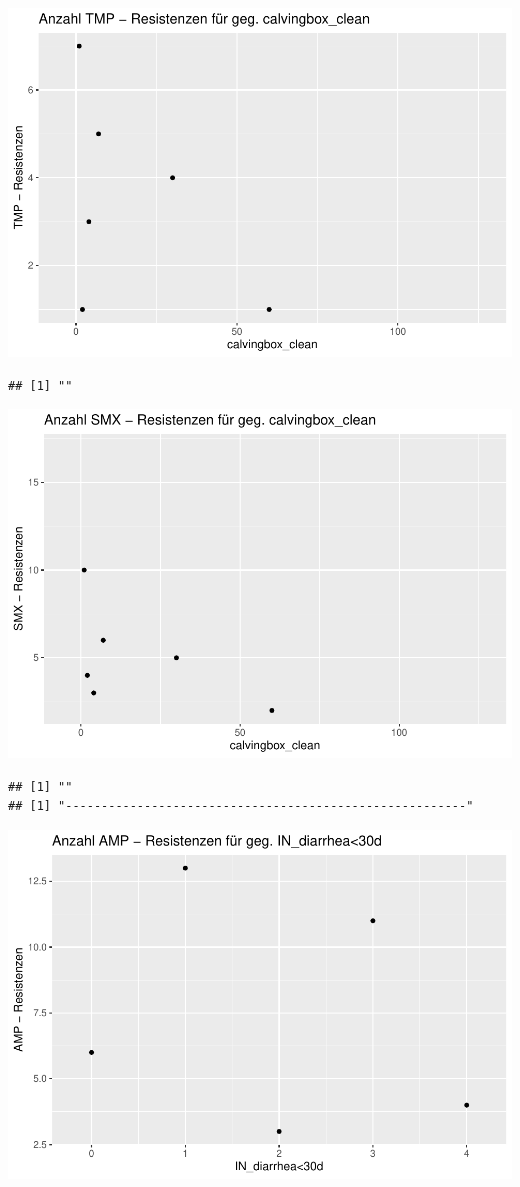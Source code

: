 \documentclass[
]{article}
\begin{document}
\includegraphics{NResistenzen_files/figure-latex/unnamed-chunk-6-29.pdf}

\begin{verbatim}
## [1] ""
\end{verbatim}

\includegraphics{NResistenzen_files/figure-latex/unnamed-chunk-6-30.pdf}

\begin{verbatim}
## [1] ""
## [1] "--------------------------------------------------------"
\end{verbatim}

\includegraphics{NResistenzen_files/figure-latex/unnamed-chunk-6-31.pdf}
\end{document}
